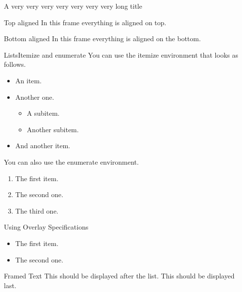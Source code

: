 \documentclass[final]{beamer}
\begin{document}
%
%
%
%
%
\begin{frame}{A very very very very very very very long title}

\end{frame}
%
%
%
%
%
\begin{frame}[t]{Top aligned}
  In this frame everything is aligned on top.
\end{frame}
%
%
%
%
%
\begin{frame}[b]{Bottom aligned}
  In this frame everything is aligned on the bottom.
\end{frame}
%
%
%
%
%
\begin{frame}{Lists}{Itemize and enumerate}
  You can use the itemize environment that looks as follows.
  \begin{itemize}
    \item An item.
    \item Another one.
      \begin{itemize}
        \item A subitem.
        \item Another subitem.
      \end{itemize}
    \item And another item.
  \end{itemize}
  \vfill%
  You can also use the enumerate environment.
  \begin{enumerate}
    \item The first item.
    \item The second one.
    \item The third one.
  \end{enumerate}
\end{frame}

\begin{frame}{Using Overlay Specifications}
  \begin{itemize}[<+(1)->]
    \item The first item.
    \item The second one.
  \end{itemize}
  \pause
  \begin{block}{Framed Text}
    This should be displayed after the list.
    \pause
    This should be displayed last.
  \end{block}
\end{frame}
%
%
%
%
%
\end{document}
